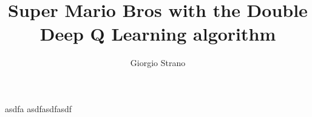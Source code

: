 \documentclass[12pt]{report}
\title{Super Mario Bros with the Double Deep Q Learning algorithm}
\author{Giorgio Strano}
\date{ }
\begin{document}
\maketitle

 asdfa asdfasdfasdf
\end{document}
